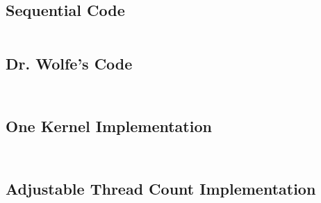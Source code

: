 \documentclass[10pt]{article}
\begin{document}

\subsection{Sequential Code}
\inputminted[linenos, fontsize=\footnotesize]{c}{../jacobi_final/seq_jacobi.c}

\subsection{Dr. Wolfe's Code}
\inputminted[linenos, fontsize=\footnotesize]{c}{../jacobi_final/original_jacobi5.cu}
\inputminted[linenos, fontsize=\footnotesize]{c}{../jacobi_final/original_jacobi6.cu}

\subsection{One Kernel Implementation}
\inputminted[linenos, fontsize=\footnotesize]{c}{../jacobi_final/1k_jacobi5.cu}
\inputminted[linenos, fontsize=\footnotesize]{c}{../jacobi_final/1k_jacobi6.cu}

\subsection{Adjustable Thread Count Implementation}
\inputminted[linenos, fontsize=\footnotesize]{c}{../jacobi_final/orig_J6M_v2.cu}
\inputminted[linenos, fontsize=\footnotesize]{c}{../jacobi_final/1k_J6M_v2.cu}
\end{document}
